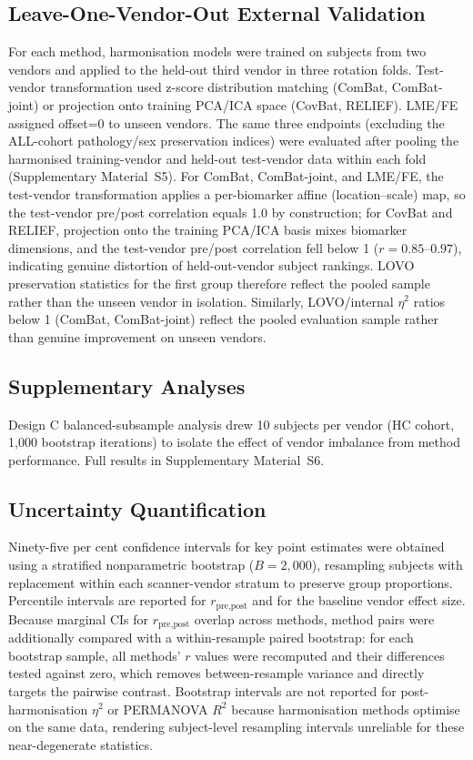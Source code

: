 \documentclass[12pt,a4paper]{article}
\begin{document}
\subsection{Leave-One-Vendor-Out External Validation}

For each method, harmonisation models were trained on subjects from two vendors and applied to the held-out third vendor in three rotation folds. Test-vendor transformation used z-score distribution matching (ComBat, ComBat-joint) or projection onto training PCA/ICA space (CovBat, RELIEF). LME/FE assigned offset=0 to unseen vendors. The same three endpoints (excluding the ALL-cohort pathology/sex preservation indices) were evaluated after pooling the harmonised training-vendor and held-out test-vendor data within each fold (Supplementary Material~S5). For ComBat, ComBat-joint, and LME/FE, the test-vendor transformation applies a per-biomarker affine (location--scale) map, so the test-vendor pre/post correlation equals 1.0 by construction; for CovBat and RELIEF, projection onto the training PCA/ICA basis mixes biomarker dimensions, and the test-vendor pre/post correlation fell below 1 ($r=0.85$--$0.97$), indicating genuine distortion of held-out-vendor subject rankings. LOVO preservation statistics for the first group therefore reflect the pooled sample rather than the unseen vendor in isolation. Similarly, LOVO/internal $\eta^2$ ratios below 1 (ComBat, ComBat-joint) reflect the pooled evaluation sample rather than genuine improvement on unseen vendors.

\subsection{Supplementary Analyses}

Design C balanced-subsample analysis drew 10 subjects per vendor (HC cohort, 1,000 bootstrap iterations) to isolate the effect of vendor imbalance from method performance. Full results in Supplementary Material~S6.

\subsection{Uncertainty Quantification}

Ninety-five per cent confidence intervals for key point estimates were obtained using a stratified nonparametric bootstrap ($B=2{,}000$), resampling subjects with replacement within each scanner-vendor stratum to preserve group proportions. Percentile intervals are reported for $r_{\text{pre,post}}$ and for the baseline vendor effect size. Because marginal CIs for $r_{\text{pre,post}}$ overlap across methods, method pairs were additionally compared with a within-resample paired bootstrap: for each bootstrap sample, all methods' $r$ values were recomputed and their differences tested against zero, which removes between-resample variance and directly targets the pairwise contrast. Bootstrap intervals are not reported for post-harmonisation $\eta^2$ or PERMANOVA $R^2$ because harmonisation methods optimise on the same data, rendering subject-level resampling intervals unreliable for these near-degenerate statistics.
\end{document}
